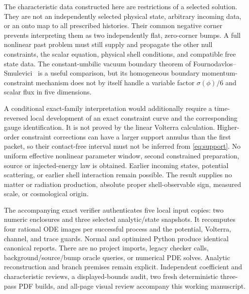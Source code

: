 \documentclass[11pt]{article}
\begin{document}
The characteristic data constructed here are restrictions of a selected
solution. They are not an independently selected physical state, arbitrary
incoming data, or an onto map to all prescribed histories. Their common
negative corner prevents interpreting them as two independently flat,
zero-corner bumps. A full nonlinear past problem must still supply and
propagate the other null constraints, the scalar equation, physical
shell conditions, and compatible free state data.
The constant-umbilic vacuum boundary theorem of
Fournodavlos--Smulevici~\cite{fs} is a useful comparison, but its homogeneous
boundary momentum-constraint mechanism does not by itself handle a
variable factor $\sigma(\phi)/6$ and scalar flux in five dimensions.

A conditional exact-family interpretation would additionally require a
time-reversed local development of an exact constraint curve and the
corresponding gauge identification. It is not proved by the linear
Volterra calculation. Higher-order constraint corrections can have a
larger support annulus than the first packet, so their contact-free
interval must not be inferred from \eqref{eq:support}.
No uniform effective nonlinear parameter window, second constrained
preparation, source or injected-energy law is obtained. Earlier incoming
states, potential scattering, or earlier shell interaction remain possible.
The result supplies no matter or radiation production, absolute proper
shell-observable sign, measured scale, or cosmological origin.

The accompanying exact verifier authenticates five local input copies:
two numeric enclosures and three selected analytic/state snapshots.
It recomputes four rational ODE images per successful process and the
potential, Volterra, channel, and trace guards. Normal and optimized
Python produce identical canonical reports. There are no project imports,
legacy checker calls, background/source/bump oracle queries, or numerical
PDE solves. Analytic reconstruction and branch premises remain explicit.
Independent coefficient and characteristic reviews, a displayed-bounds
audit, two fresh deterministic three-pass PDF builds, and all-page
visual review accompany this working manuscript.
\end{document}
